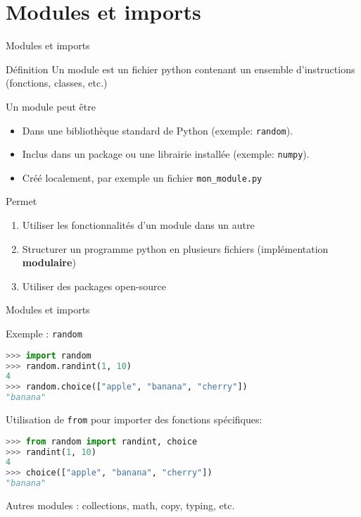 \section{Modules et imports}

\begin{frame}{Modules et imports}
  
  \begin{block}{Définition}    
    \medskip
    Un module est un fichier python contenant un ensemble d'instructions (fonctions, classes, etc.)

    Un module peut être 
    \begin{itemize}
      \item <+-> Dans une bibliothèque standard de Python (exemple: \texttt{random}).
      \item <+-> Inclus dans un package ou une librairie installée (exemple: \texttt{numpy}).
      \item <+-> Créé localement, par exemple un fichier \texttt{mon\_module.py}
    \end{itemize}
  \end{block}

  \begin{exampleblock}{Permet}
    \medskip
    \begin{enumerate}
    \item Utiliser les fonctionnalités d'un module dans un autre
    \item Structurer un programme python en plusieurs fichiers (implémentation \textbf{modulaire})
    \item Utiliser des packages open-source
  \end{enumerate}
\end{exampleblock}
  
\end{frame}

\begin{frame}[fragile]{Modules et imports}

  \begin{block}{Exemple : \texttt{random}} 
\begin{lstlisting}[language=Python, numbers=none]
>>> import random
>>> random.randint(1, 10)
4
>>> random.choice(["apple", "banana", "cherry"])
"banana"
\end{lstlisting}
  Utilisation de \texttt{from} pour importer des fonctions spécifiques:
  \begin{lstlisting}[language=Python, numbers=none]
>>> from random import randint, choice
>>> randint(1, 10)
4
>>> choice(["apple", "banana", "cherry"])
"banana"
\end{lstlisting}
  Autres modules : collections, math, copy, typing, etc.
  \end{block}

\end{frame}

